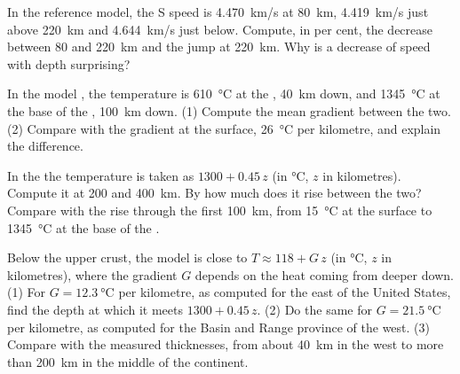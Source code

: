 \begin{exercise}[$\star\star$]\label{exo:g11:lithosphere-asthenosphere:9}
In the reference model, the S speed is \qty{4.470}{km/s} at \qty{80}{km},
\qty{4.419}{km/s} just above \qty{220}{km} and \qty{4.644}{km/s} just below.
Compute, in per cent, the decrease between 80 and \qty{220}{km} and the jump
at \qty{220}{km}. Why is a decrease of speed with depth surprising?
\end{exercise}

\begin{exercise}[$\star\star$]\label{exo:g11:lithosphere-asthenosphere:10}
In the model , the temperature is \qty{610}{\celsius} at the ,
\qty{40}{km} down, and \qty{1345}{\celsius} at the base of the ,
\qty{100}{km} down. (1) Compute the mean gradient between the two. (2)
Compare with the gradient at the surface, \qty{26}{\celsius} per kilometre,
and explain the difference.
\end{exercise}

\begin{exercise}[$\star\star$]\label{exo:g11:lithosphere-asthenosphere:11}
In the  the temperature is taken as $1300 + 0.45\,z$ (in
\unit{\celsius}, $z$ in kilometres). Compute it at 200 and \qty{400}{km}. By
how much does it rise between the two? Compare with the rise through the
first \qty{100}{km}, from \qty{15}{\celsius} at the surface to
\qty{1345}{\celsius} at the base of the .
\end{exercise}

\begin{exercise}[$\star\star\star$]\label{exo:g11:lithosphere-asthenosphere:12}
Below the upper crust, the model  is close to $T \approx 118 +
G\,z$ (in \unit{\celsius}, $z$ in kilometres), where the gradient $G$
depends on the heat coming from deeper down. (1) For $G =
\qty{12.3}{\celsius}$ per kilometre, as computed for the east of the United
States, find the depth at which it meets $1300 + 0.45\,z$. (2) Do the same
for $G = \qty{21.5}{\celsius}$ per kilometre, as computed for the Basin and
Range province of the west. (3) Compare with the measured thicknesses, from about
\qty{40}{km} in the west to more than \qty{200}{km} in the middle of the
continent.
\end{exercise}

